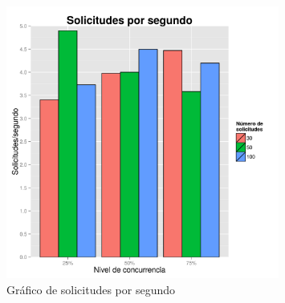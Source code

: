 \begin{figure}[!ht]
	\begin{center}
		\includegraphics[width=0.8\textwidth]{../graphics/gra_sps.png}
		\caption{Gráfico de solicitudes por segundo}
		\label{fig:gra_sps}
	\end{center}
\end{figure}

\newpage
